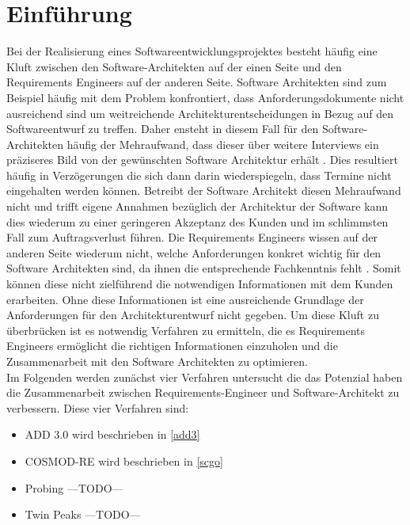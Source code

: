 \section{Einf\"uhrung}
Bei der Realisierung eines Softwareentwicklungsprojektes besteht häufig eine Kluft zwischen den Software-Architekten auf der einen Seite und den Requirements Engineers auf der anderen Seite. Software Architekten sind zum Beispiel häufig mit dem Problem konfrontiert, dass Anforderungsdokumente nicht ausreichend sind um weitreichende Architekturentscheidungen in Bezug auf den Softwareentwurf zu treffen. Daher ensteht in diesem Fall für den Software-Architekten häufig der Mehraufwand, dass dieser über weitere Interviews ein präziseres Bild von der gewünschten Software Architektur erhält \cite{probing}. Dies resultiert häufig in Verzögerungen die sich dann darin wiederspiegeln, dass Termine nicht eingehalten werden können. Betreibt der Software Architekt diesen Mehraufwand nicht und trifft eigene Annahmen bezüglich der Architektur der Software \cite{probing} kann dies wiederum zu einer geringeren Akzeptanz des Kunden und im schlimmsten Fall zum Auftragsverlust führen. Die Requirements Engineers wissen auf der anderen Seite wiederum nicht, welche Anforderungen konkret wichtig für den Software Architekten sind, da ihnen die entsprechende Fachkenntnis fehlt \cite{probing}. Somit können diese nicht zielführend die notwendigen Informationen mit dem Kunden erarbeiten. Ohne diese Informationen ist eine ausreichende Grundlage der Anforderungen für den Architekturentwurf nicht gegeben. Um diese Kluft zu überbrücken ist es notwendig Verfahren zu ermitteln, die es Requirements Engineers ermöglicht die richtigen Informationen einzuholen und die Zusammenarbeit mit den Software Architekten zu optimieren.\\

Im Folgenden werden zunächst vier Verfahren untersucht die das Potenzial haben die Zusammenarbeit zwischen Requirements-Engineer und Software-Architekt zu verbessern. Diese vier Verfahren sind:\\

\begin{itemize}
\item ADD 3.0 wird beschrieben in \ref{add3}
\item COSMOD-RE wird beschrieben in \ref{scgo}
\item Probing ---TODO---
\item Twin Peaks ---TODO---\\
\end{itemize}


